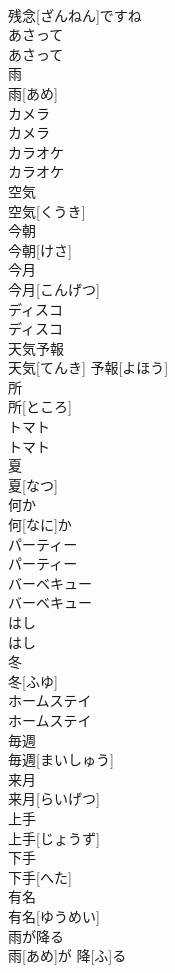 \documentclass[8pt]{extreport}
\begin{document}
\begin{CJK}{UTF8}{min}
\\	残念[ざんねん]ですね
\\	あさって	
\\	あさって
\\	雨	
\\	雨[あめ]
\\	カメラ	
\\	カメラ
\\	カラオケ	
\\	カラオケ
\\	空気	
\\	空気[くうき]
\\	今朝	
\\	今朝[けさ]
\\	今月	
\\	今月[こんげつ]
\\	ディスコ	
\\	ディスコ
\\	天気予報	
\\	天気[てんき] 予報[よほう]
\\	所	
\\	所[ところ]
\\	トマト	
\\	トマト
\\	夏	
\\	夏[なつ]
\\	何か	
\\	何[なに]か
\\	パーティー	
\\	パーティー
\\	バーベキュー	
\\	バーベキュー
\\	はし	
\\	はし
\\	冬	
\\	冬[ふゆ]
\\	ホームステイ	
\\	ホームステイ
\\	毎週	
\\	毎週[まいしゅう]
\\	来月	
\\	来月[らいげつ]
\\	上手	
\\	上手[じょうず]
\\	下手	
\\	下手[へた]
\\	有名	
\\	有名[ゆうめい]
\\	雨が降る	
\\	雨[あめ]が 降[ふ]る

\end{CJK}
\end{document}
